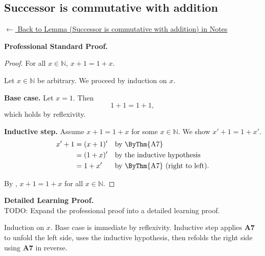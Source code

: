 
\subsection*{Successor is commutative with addition}
\label{prf:landau-succ-comm}

\begin{remark*}[Return]
\hyperref[lem:landau-succ-comm]{$\leftarrow$ Back to Lemma
(Successor is commutative with addition) in Notes}
\end{remark*}

\textbf{Professional Standard Proof.}~\\
\begin{proof}
\Claim For all $x \in \mathbb{N}$, $x + 1 = 1 + x$.

Let $x \in \mathbb{N}$ be arbitrary. We proceed by induction on $x$.

\textbf{Base case.} Let $x = 1$. Then
\[
  1 + 1 = 1 + 1,
\]
which holds by reflexivity.

\textbf{Inductive step.} Assume $x + 1 = 1 + x$ for some $x \in \mathbb{N}$.
We show $x' + 1 = 1 + x'$.
\[
\begin{aligned}
  x' + 1
    &= (x + 1)'  && \text{by \ByThm{A7}} \\
    &= (1 + x)'  && \text{by the inductive hypothesis} \\
    &= 1 + x'    && \text{by \ByThm{A7} (right to left).}
\end{aligned}
\]

By , $x + 1 = 1 + x$ for all $x \in \mathbb{N}$.
\end{proof}

\textbf{Detailed Learning Proof.}~\\
TODO: Expand the professional proof into a detailed learning proof.


\begin{remark*}
Induction on $x$. Base case is immediate by reflexivity. Inductive step
applies \textbf{A7} to unfold the left side, uses the inductive hypothesis,
then refolds the right side using \textbf{A7} in reverse.

\end{remark*}

